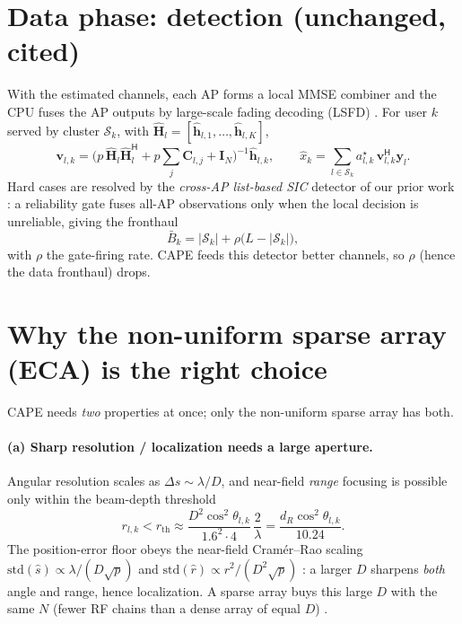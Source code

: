 \documentclass[11pt]{article}
\newcommand{\herm}{^{\mathsf{H}}}
\newcommand{\abs}[1]{\left|#1\right|}
\newcommand{\vh}{\mathbf{h}}
\newcommand{\vv}{\mathbf{v}}
\newcommand{\vy}{\mathbf{y}}
\newcommand{\mC}{\mathbf{C}}
\newcommand{\mI}{\mathbf{I}}
\newcommand{\mH}{\mathbf{H}}
\begin{document}
\section{Data phase: detection (unchanged, cited)}

With the estimated channels, each AP forms a local MMSE combiner and the CPU fuses the AP outputs by
large-scale fading decoding (LSFD) \cite{bjornson2020scalable,ngo2017cellfree}. For user $k$ served
by cluster $\mathcal S_k$, with $\hat{\mH}_l=[\hat{\vh}_{l,1},\dots,\hat{\vh}_{l,K}]$,
\begin{equation}
\vv_{l,k}=\Big(p\,\hat{\mH}_l\hat{\mH}_l\herm+p\!\sum_j\mC_{l,j}+\mI_N\Big)^{-1}\hat{\vh}_{l,k},
\qquad
\hat x_k=\sum_{l\in\mathcal S_k} a_{l,k}^\star\,\vv_{l,k}\herm\vy_l .
\label{eq:mmse}
\end{equation}
Hard cases are resolved by the \emph{cross-AP list-based SIC} detector of our prior work
\cite{haider2026icassp,haider2026vtc,haider2026wcl}: a reliability gate fuses all-AP observations
only when the local decision is unreliable, giving the fronthaul
\begin{equation}
\bar B_k=\abs{\mathcal S_k}+\rho\big(L-\abs{\mathcal S_k}\big),
\label{eq:fronthaul}
\end{equation}
with $\rho$ the gate-firing rate. CAPE feeds this detector better channels, so $\rho$ (hence the
data fronthaul) drops.

\section{Why the non-uniform sparse array (ECA) is the right choice}

CAPE needs \emph{two} properties at once; only the non-uniform sparse array has both.

\paragraph{(a) Sharp resolution / localization needs a large aperture.}
Angular resolution scales as $\Delta s\!\sim\!\lambda/D$, and near-field \emph{range} focusing is
possible only within the beam-depth threshold \cite[Prop.~2]{zhou2025sparse}
\begin{equation}
r_{l,k}<r_{\mathrm{th}}\approx \frac{D^2\cos^2\theta_{l,k}}{1.6^2\cdot 4}\,\frac{2}{\lambda}
=\frac{d_R\cos^2\theta_{l,k}}{10.24}.
\label{eq:depth}
\end{equation}
The position-error floor obeys the near-field Cram\'er--Rao scaling
$\mathrm{std}(\hat s)\!\propto\!\lambda/(D\sqrt{p})$ and
$\mathrm{std}(\hat r)\!\propto\!r^2/(D^2\sqrt{p})$ \cite{lu2024tutorial,kosasih2025mla}: a larger $D$
sharpens \emph{both} angle and range, hence localization. A sparse array buys this large $D$
with the same $N$ (fewer RF chains than a dense array of equal $D$) \cite{wang2024xltutorial}.
\end{document}
